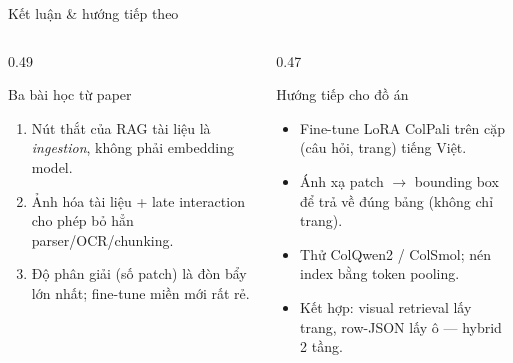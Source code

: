 \documentclass[aspectratio=169,10pt]{beamer}
\begin{document}
\begin{frame}{Kết luận \& hướng tiếp theo}
  \begin{columns}[T]
    \begin{column}{0.49\textwidth}
      \begin{block}{\small Ba bài học từ paper}
        \footnotesize
        \begin{enumerate}
          \item Nút thắt của RAG tài liệu là \emph{ingestion}, không phải embedding model.
          \item Ảnh hóa tài liệu + late interaction cho phép bỏ hẳn parser/OCR/chunking.
          \item Độ phân giải (số patch) là đòn bẩy lớn nhất; fine-tune miền mới rất rẻ.
        \end{enumerate}
      \end{block}
    \end{column}
    \begin{column}{0.47\textwidth}
      \begin{block}{\small Hướng tiếp cho đồ án}
        \footnotesize
        \begin{itemize}
          \item Fine-tune LoRA ColPali trên cặp (câu hỏi, trang) tiếng Việt.
          \item Ánh xạ patch $\rightarrow$ bounding box để trả về đúng bảng (không chỉ trang).
          \item Thử ColQwen2 / ColSmol; nén index bằng token pooling.
          \item Kết hợp: visual retrieval lấy trang, row-JSON lấy ô --- hybrid 2 tầng.
        \end{itemize}
      \end{block}
    \end{column}
  \end{columns}
\end{frame}
\end{document}
